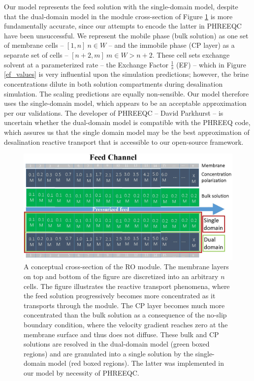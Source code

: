 \begin{supplementary}
Our model represents the feed solution with the single-domain model, despite that the dual-domain model in the module cross-section of Figure \ref{single_dual_domain} is more fundamentally accurate, since our attempts to encode the latter in PHREEQC have been unsuccessful. We represent the mobile phase (bulk solution) as one set of membrane cells -- $[1,n]~n\in W$ -- and the immobile phase (CP layer) as a separate set of cells -- $[n+2,m]~m \in W>n+2$. These cell sets exchange solvent at a parameterized rate -- the Exchange Factor $\frac{1}{s}$ (EF) -- which in Figure \ref{ef_values} is very influential upon the simulation predictions; however, the brine concentrations dilute in both solution compartments during desalination simulation. The scaling predictions are equally non-sensible. Our model therefore uses the single-domain model, which appears to be an acceptable approximation per our validations. The developer of PHREEQC -- David Parkhurst -- is uncertain whether the dual-domain model is compatible with the PHREEQ code, which assures us that the single domain model may be the best approximation of desalination reactive transport that is accessible to our open-source framework.

\begin{figure}
    \centering
    \includegraphics[width = \textwidth]{../images/ROSSpy/supporting_information/single_dual_domain.jpg}
    \caption{
        A conceptual cross-section of the RO module. The membrane layers on top and bottom of the figure are discretized into an arbitrary $n$ cells. The figure illustrates the reactive transport phenomena, where the feed solution progressively becomes more concentrated as it transports through the module. The CP layer becomes much more concentrated than the bulk solution as a consequence of the no-slip boundary condition, where the velocity gradient reaches zero at the membrane surface and thus does not diffuse. These bulk and CP solutions are resolved in the dual-domain model (green boxed regions) and are granulated into a single solution by the single-domain model (red boxed regions). The latter was implemented in our model by necessity of PHREEQC.
    }
    \label{single_dual_domain}
\end{figure}


\end{supplementary}
